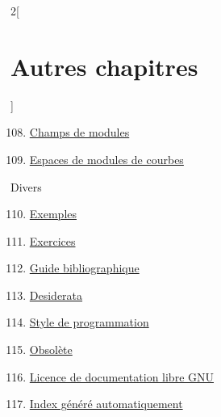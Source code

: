 \begin{multicols}{2}[\section{Autres chapitres}]
\begin{enumerate}
\setcounter{enumi}{107}
\item \hyperref[moduli-section-phantom]{Champs de modules}
\item \hyperref[moduli-curves-section-phantom]{Espaces de modules de courbes}
\end{enumerate}
Divers
\begin{enumerate}
\setcounter{enumi}{109}
\item \hyperref[examples-section-phantom]{Exemples}
\item \hyperref[exercises-section-phantom]{Exercices}
\item \hyperref[guide-section-phantom]{Guide bibliographique}
\item \hyperref[desirables-section-phantom]{Desiderata}
\item \hyperref[coding-section-phantom]{Style de programmation}
\item \hyperref[obsolete-section-phantom]{Obsolète}
\item \hyperref[fdl-section-phantom]{Licence de documentation libre GNU}
\item \hyperref[index-section-phantom]{Index généré automatiquement}
\end{enumerate}
\end{multicols}
